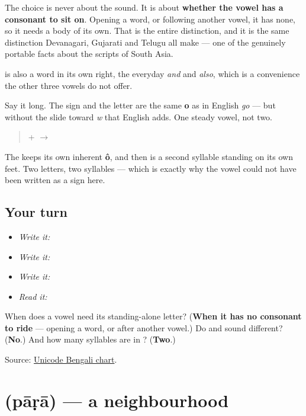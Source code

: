 The choice is never about the sound. It is about \textbf{whether the vowel has a consonant to sit on}. Opening a word, or following another vowel, it has none, so it needs a body of its own. That is the entire distinction, and it is the same distinction Devanagari, Gujarati and Telugu all make — one of the genuinely portable facts about the scripts of South Asia.

\textbf{} is also a word in its own right, the everyday \emph{and} and \emph{also}, which is a convenience the other three vowels do not offer.

Say it long. The sign \textbf{} and the letter \textbf{} are the same \textbf{o} as in English \emph{go} — but without the slide toward \emph{w} that English adds. One steady vowel, not two.

\begin{quote}
\textbf{} + \textbf{} $\to$ \textbf{}
\end{quote}

The \textbf{} keeps its own inherent \textbf{ô}, and then \textbf{} is a second syllable standing on its own feet. Two letters, two syllables — which is exactly why the vowel could not have been written as a sign here.

\subsection*{Your turn}
\begin{itemize}
\raggedright
  \item \emph{Write it:} 
  \item \emph{Write it:}    
  \item \emph{Write it:} 
  \item \emph{Read it:} 
\end{itemize}

\begin{tcolorbox}[breakable,colback=teal!4,colframe=teal!35!black,title={Before you move on}]
When does a vowel need its standing-alone letter? (\textbf{When it has no consonant to ride} — opening a word, or after another vowel.) Do \textbf{} and \textbf{} sound different? (\textbf{No}.) And how many syllables are in \textbf{}? (\textbf{Two}.)

Source: \href{https://www.unicode.org/charts/PDF/U0980.pdf}{Unicode Bengali chart}.
\end{tcolorbox}
\section[\texorpdfstring{\bn{পাড়া} (pāṛā)}{পাড়া (pāṛā)}]{ (pāṛā) — a neighbourhood}

